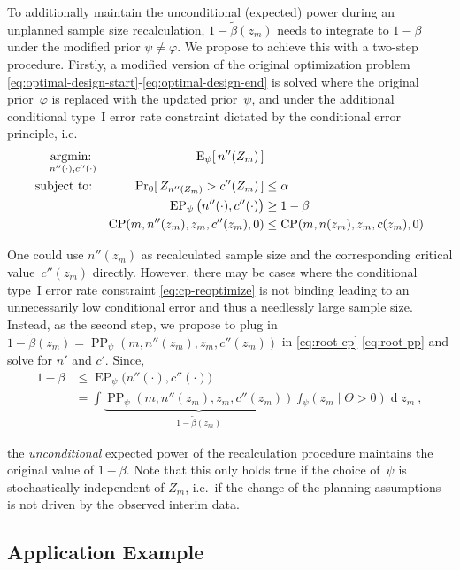 \documentclass[12pt]{article}
\renewcommand{\Pr}{\operatorname{Pr}}
\newcommand{\E}{\ensuremath{\operatorname{E}}}
\newcommand{\st}{\operatorname{subject\ to:\ }}
\newcommand{\argmin}[1]{\operatornamewithlimits{argmin:\ }_{#1}}
\newcommand{\CP}{\ensuremath{\operatorname{CP}}}
\newcommand{\PP}{\ensuremath{\operatorname{PP}}}
\newcommand{\EP}{\ensuremath{\operatorname{EP}}}
\renewcommand{\Pr}{\ensuremath{\operatorname{Pr}}}
\begin{document}
To additionally maintain the unconditional (expected) power during an unplanned sample size recalculation,
$1-\widetilde{\beta}(z_m)$ needs to integrate to $1-\beta$ under the modified prior $\psi\neq\varphi$.
We propose to achieve this with a two-step procedure.
Firstly, a modified version of the original optimization problem \eqref{eq:optimal-design-start}-\eqref{eq:optimal-design-end} is solved where the original prior~$\varphi$ is replaced with the updated prior~$\psi$,
and under the additional conditional type~I error rate constraint dictated by the conditional error principle, i.e.
{\small\begin{align}
    \argmin{n''(\cdot), c''(\cdot)}
        &&                                   \E_\psi[\,n''(Z_m)\,] & \\
    \st &&                 \Pr_{0}[\,Z_{n''(Z_m)} > c''(Z_m)\,] & \leq \alpha \\
        &&     \EP_\psi\big(n''(\cdot), c''(\cdot)\big) & \geq 1 - \beta \\
        && \CP(m, n''(z_{m}), z_{m}, c''(z_{m}), 0) &\leq \CP(m, n(z_m), z_{m}, c(z_m), 0) \label{eq:cp-reoptimize}
\end{align}}

\noindent One could use $n''(z_m)$ as recalculated sample size and the corresponding critical value~$c''(z_m)$ directly.
However, there may be cases where the conditional type~I error rate constraint \eqref{eq:cp-reoptimize} is not binding leading to an unnecessarily low conditional error and thus a needlessly large sample size.
Instead, as the second step, we propose to plug in  $1-\widetilde{\beta}(z_m)=\PP_\psi(m, n''(z_m), z_{m}, c''(z_m))$ in \eqref{eq:root-cp}-\eqref{eq:root-pp} and solve for $n'$ and $c'$.
Since,
{\small
\begin{align}
    1-\beta &\leq\EP_\psi\big(n''(\cdot), c''(\cdot)\big) \\
    &= \int \underbrace{\PP_\psi(m, n''(z_m), z_{m}, c''(z_m))}_{1-\widetilde{\beta}(z_m)} \ f_\psi(z_m \mid \Theta > 0) \operatorname{d} z_m \ ,
\end{align}}

\noindent the \emph{unconditional} expected power of the recalculation procedure maintains the original value of $1-\beta$.
Note that this only holds true if the choice of~$\psi$ is stochastically independent of $Z_m$, i.e.~if the change of the planning assumptions is not driven by the observed interim data.

\subsection{Application Example}
\label{2arm}
\end{document}
